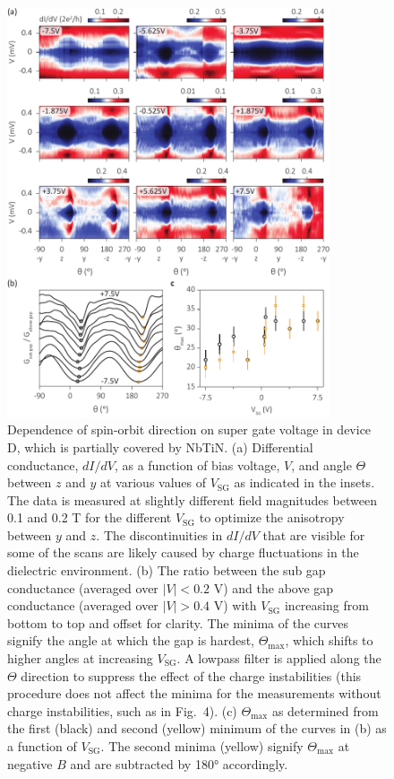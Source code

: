 \begin{figure}[p!]
\centering
\includegraphics[width=0.85\textwidth]{figures/SFig5_SGdep_half_updated.pdf}
\caption{\label{fig:SGdep}
Dependence of spin-orbit direction on super gate voltage in device D, which is partially covered by NbTiN.
(a) Differential conductance, $dI/dV$, as a function of bias voltage, $V$, and angle $\Theta$ between $z$ and $y$ at various values of $V_{\mathrm{SG}}$ as indicated in the insets.
The data is measured at slightly different field magnitudes between 0.1 and 0.2 T for the different $V_{\mathrm{SG}}$ to optimize the anisotropy between $y$ and $z$.
The discontinuities in $dI/dV$ that are visible for some of the scans are likely caused by charge fluctuations in the dielectric environment.
(b) The ratio between the sub gap conductance (averaged over $|V| < 0.2$ V) and the above gap conductance (averaged over $|V| > 0.4$ V) with $V_{\mathrm{SG}}$ increasing from bottom to top and offset for clarity.
The minima of the curves signify the angle at which the gap is hardest, $\Theta_{\mathrm{max}}$, which shifts to higher angles at increasing $V_{\mathrm{SG}}$.
A lowpass filter is applied along the $\Theta$ direction to suppress the effect of the charge instabilities (this procedure does not affect the minima for the measurements without charge instabilities, such as in Fig.~4).
(c) $\Theta_{\mathrm{max}}$ as determined from the first (black) and second (yellow) minimum of the curves in (b) as a function of $V_{\mathrm{SG}}$.
The second minima (yellow) signify $\Theta_{\mathrm{max}}$ at negative $B$ and are subtracted by \ang{180} accordingly.
}
\end{figure}

